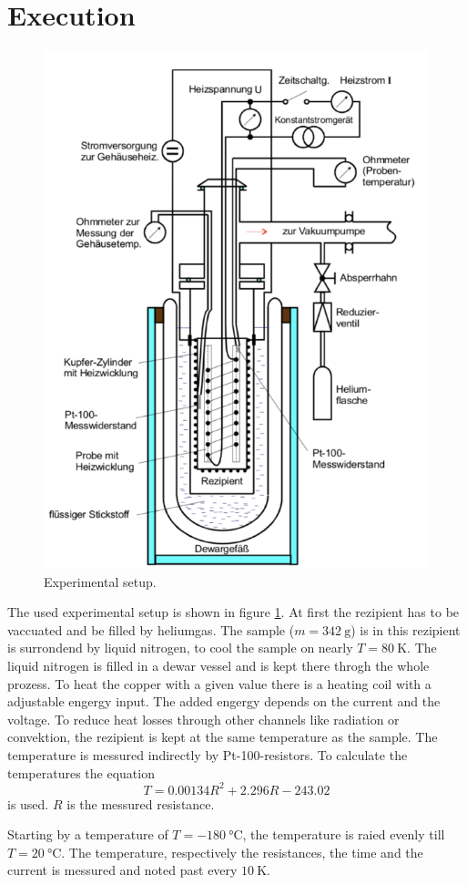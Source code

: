 \section{Execution}
\label{sec:Durchführung}

\begin{figure}
    \centering 
    \includegraphics[width=.8\textwidth]{Bilder/Aufbau.PNG}
    \caption{Experimental setup.}
    \label{fig:Aufbau}
\end{figure}


The used experimental setup is shown in figure \ref{fig:Aufbau}.
At first the rezipient has to be vaccuated and be filled by heliumgas.
The sample ($m=\SI{342}{\g}$) is in this rezipient is surrondend by liquid nitrogen, to cool the sample on nearly $T=\SI{80}{\kelvin}$. 
The liquid nitrogen is filled in a dewar vessel and is kept there throgh the whole prozess.
To heat the copper with a given value there is a heating coil with a adjustable engergy input.
The added engergy depends on the current and the voltage.
To reduce heat losses through other channels like radiation or convektion, the rezipient is kept at the same temperature as the sample.
The temperature is messured indirectly by Pt-100-resistors.
To calculate the temperatures the equation
\begin{equation}
    T = 0.00134 R^2 + 2.296 R - 243.02
\end{equation}
is used.
$R$ is the messured resistance.




Starting by a temperature of $T=\SI{-180}{\celsius}$, the temperature is raied evenly till $T=\SI{20}{\celsius}$. 
The temperature, respectively the resistances, the time and the current is messured and noted past every $\SI{10}{\kelvin}$.
